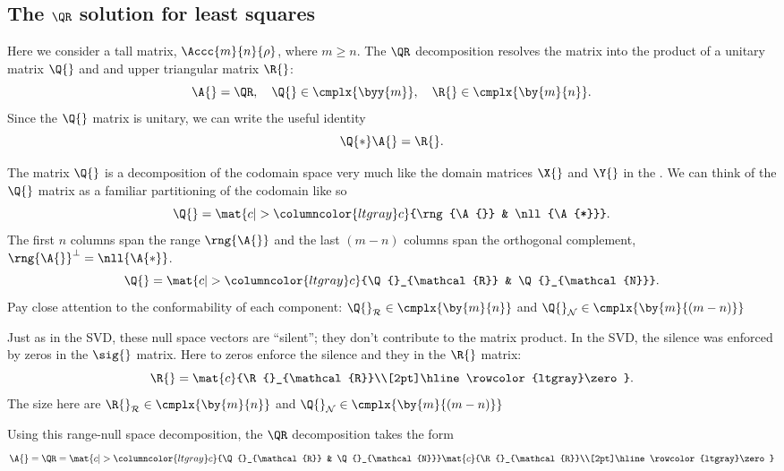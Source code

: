 \subsection{The $\QR$ solution for least squares}
Here we consider a tall matrix, $\Accc{m}{n}{\rho}$, where $m\ge n$. The $\QR$ decomposition resolves the matrix into the product of a unitary matrix $\Q{}$ and and upper triangular matrix $\R{}$:
\begin{equation}
  \A{} = \QR, \quad \Q{}\in\cmplx{\byy{m}}, \quad \R{}\in\cmplx{\by{m}{n}}.
\end{equation}
Since the $\Q{}$ matrix is unitary, we can write the useful identity
\begin{equation}
  \Q{*}\A{} = \R{}.
  \label{eq:unitary:qar}
\end{equation}

The matrix $\Q{}$ is a decomposition of the codomain space very much like the domain matrices $\X{}$ and $\Y{}$ in the \svdl. We can think of the $\Q{}$ matrix as a familiar partitioning of the codomain like so
\begin{equation}
  \Q{} = \mat{c|>{\columncolor{ltgray}}c}{\rng{\A{}} & \nll{\A{*}}}.
\end{equation}
The first $n$ columns span the range $\rng{\A{}}$ and the last $(m-n)$ columns span the orthogonal complement, $\rng{\A{}}^{\perp} = \nll{\A{*}}$.
\begin{equation}
  \Q{} = \mat{c|>{\columncolor{ltgray}}c}{\Q{}_{\mathcal{R}} & \Q{}_{\mathcal{N}}}.
\end{equation}
Pay close attention to the conformability of each component: $\Q{}_{\mathcal{R}}\in\cmplx{\by{m}{n}}$ and $\Q{}_{\mathcal{N}}\in\cmplx{\by{m}{(m-n)}}$

Just as in the SVD, these null space vectors are ``silent''; they don't contribute to the matrix product. In the SVD, the silence was enforced by zeros in the $\sig{}$ matrix. Here to zeros enforce the silence and they in the $\R{}$ matrix:
\begin{equation}
  \R{} = \mat{c}{\R{}_{\mathcal{R}}\\[2pt]\hline\rowcolor{ltgray}\zero}.
\end{equation}
The size here are $\R{}_{\mathcal{R}}\in\cmplx{\by{m}{n}}$ and $\Q{}_{\mathcal{N}}\in\cmplx{\by{m}{(m-n)}}$

Using this range-null space decomposition, the $\QR$ decomposition takes the form
\begin{equation}
  \A{} = \QR = \mat{c|>{\columncolor{ltgray}}c}{\Q{}_{\mathcal{R}} & \Q{}_{\mathcal{N}}}\mat{c}{\R{}_{\mathcal{R}}\\[2pt]\hline\rowcolor{ltgray}\zero}
\end{equation}

